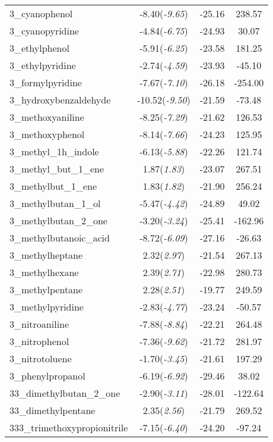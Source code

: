 \documentclass{amsart}
\begin{document}
\begin{center}
\begin{longtable}{l|c|c|c}
3\_cyanophenol & -8.40(\textit{-9.65}) & -25.16 & 238.57 \\ 
3\_cyanopyridine & -4.84(\textit{-6.75}) & -24.93 & 30.07 \\ 
3\_ethylphenol & -5.91(\textit{-6.25}) & -23.58 & 181.25 \\ 
3\_ethylpyridine & -2.74(\textit{-4.59}) & -23.93 & -45.10 \\ 
3\_formylpyridine & -7.67(\textit{-7.10}) & -26.18 & -254.00 \\ 
3\_hydroxybenzaldehyde & -10.52(\textit{-9.50}) & -21.59 & -73.48 \\ 
3\_methoxyaniline & -8.25(\textit{-7.29}) & -21.62 & 126.53 \\ 
3\_methoxyphenol & -8.14(\textit{-7.66}) & -24.23 & 125.95 \\ 
3\_methyl\_1h\_indole & -6.13(\textit{-5.88}) & -22.26 & 121.74 \\ 
3\_methyl\_but\_1\_ene & 1.87(\textit{1.83}) & -23.07 & 267.51 \\ 
3\_methylbut\_1\_ene & 1.83(\textit{1.82}) & -21.90 & 256.24 \\ 
3\_methylbutan\_1\_ol & -5.47(\textit{-4.42}) & -24.89 & 49.02 \\ 
3\_methylbutan\_2\_one & -3.20(\textit{-3.24}) & -25.41 & -162.96 \\ 
3\_methylbutanoic\_acid & -8.72(\textit{-6.09}) & -27.16 & -26.63 \\ 
3\_methylheptane & 2.32(\textit{2.97}) & -21.54 & 267.13 \\ 
3\_methylhexane & 2.39(\textit{2.71}) & -22.98 & 280.73 \\ 
3\_methylpentane & 2.28(\textit{2.51}) & -19.77 & 249.59 \\ 
3\_methylpyridine & -2.83(\textit{-4.77}) & -23.24 & -50.57 \\ 
3\_nitroaniline & -7.88(\textit{-8.84}) & -22.21 & 264.48 \\ 
3\_nitrophenol & -7.36(\textit{-9.62}) & -21.72 & 281.97 \\ 
3\_nitrotoluene & -1.70(\textit{-3.45}) & -21.61 & 197.29 \\ 
3\_phenylpropanol & -6.19(\textit{-6.92}) & -29.46 & 38.02 \\ 
33\_dimethylbutan\_2\_one & -2.90(\textit{-3.11}) & -28.01 & -122.64 \\ 
33\_dimethylpentane & 2.35(\textit{2.56}) & -21.79 & 269.52 \\ 
333\_trimethoxypropionitrile & -7.15(\textit{-6.40}) & -24.20 & -97.24 \\ 

\end{longtable}
\end{center}
\end{document}
